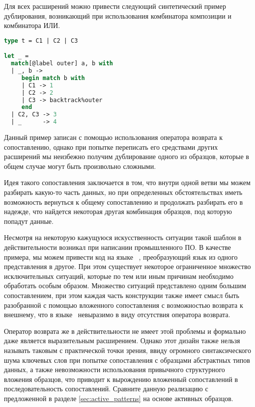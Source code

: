 Для всех расширений можно привести следующий синтетический пример дублирования, возникающий при использования комбинатора композиции и комбинатора ИЛИ.

\noindent
\begin{minipage}{\linewidth}
\begin{lstlisting}[language=ocaml]
type t = C1 | C2 | C3

let _ =
  match[@label outer] a, b with
  | _, b ->
     begin match b with
     | C1 -> 1
     | C2 -> 2
     | C3 -> backtrack%outer
     end
  | C2, C3 -> 3
  | _      -> 4
\end{lstlisting}
\end{minipage}

Данный пример записан с помощью использования оператора возврата к сопоставлению, однако при попытке переписать его средствами других расширений мы неизбежно получим дублирование одного из образцов, которые в общем случае могут быть произвольно сложными.

Идея такого сопоставления заключается в том, что внутри одной ветви мы можем разбирать какую-то часть данных, но при определенных обстоятельствах иметь возможность вернуться к общему сопоставлению и продолжать разбирать его в надежде, что найдется некоторая другая комбинация образцов, под которую попадут данные. 

Несмотря на некоторую кажущуюся искусственность ситуации такой шаблон в действительности возникал при написании промышленного ПО. В качестве примера, мы можем привести код на языке \Scala~\cite{unexpresiveness_example}, преобразующий язык из одного представления в другое. При этом существует некоторое ограниченное множество исключительных ситуаций, которые по тем или иным причинам необходимо обработать особым образом. Множество ситуаций представлено одним большим сопоставлением, при этом каждая часть конструкции также имеет смысл быть разобранной с помощью вложенного сопоставления с возможностью возврата к внешнему, что в языке \Scala~невыразимо в виду отсутствия оператора возврата.

Оператор возврата же в действительности не имеет этой проблемы и формально даже является выразительным расширением. Однако этот дизайн также нельзя называть таковым с практической точки зрения, ввиду огромного синтаксического шума ключевых слов при попытке сопоставления с образцами абстрактных типов данных, а также невозможности использования привычного структурного вложения образцов, что приводит к вырождению вложенный сопоставлений в последовательность сопоставлений. Сравните данную реализацию с предложенной в разделе \ref{sec:active_patterns} на основе активных образцов.

